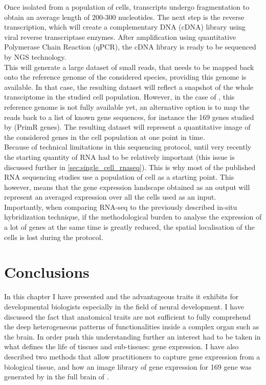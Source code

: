     Once isolated from a population of cells, transcripts undergo fragmentation to obtain an average length of 200-300 nucleotides. The next step is the reverse transcription, which will create a complementary DNA (cDNA) library using viral reverse transcriptase enzymes. After amplification using quantitative Polymerase Chain Reaction (qPCR), the cDNA library is ready to be sequenced by NGS technology.\\
    
    This will generate a large dataset of small reads, that needs to be mapped back onto the reference genome of the considered species, providing this genome is available. In that case, the resulting dataset will reflect a snapshot of the whole transciptome in the studied cell population. However, in the case of \platy{}, this reference genome is not fully available yet, an alternative option is to map the reads back to a list of known gene sequences, for instance the 169 genes studied by \cite{Tomer10} (PrimR genes). The resulting dataset will represent a quantitative image of the considered genes in the cell population at one point in time.\\
    
    Because of technical limitations in this sequencing protocol, until very recently the starting quantity of RNA had to be relatively important (this issue is discussed further in \ref{sec:single_cell_rnaseq}). This is why most of the published RNA sequencing studies use a population of cell as a starting point. This however, means that the gene expression landscape obtained as an output will represent an averaged expression over all the cells used as an input.\\
    
    Importantly, when comparing RNA-seq to the previously described in-situ hybridization technique, if the methodological burden to analyse the expression of a lot of genes at the same time is greatly reduced, the spatial localisation of the cells is lost during the protocol.\\
    
\section{Conclusions}
     
     In this chapter I have presented \platyfull{} and the advantageous traits it exhibits for developmental biologists especially in the field of neural development. I have discussed the fact that anatomical traits are not sufficient to fully comprehend the deep heterogeneous patterns of functionalities inside a complex organ such as the brain. In order push this understanding further an interest had to be taken in what defines the life of tissues and sub-tissues: gene expression. I have also described two methods that allow practitioners to capture gene expression from a biological tissue, and how an image library  of gene expression for 169 gene was generated by \cite{Tomer10} in the full brain of \platy{}.\\
     
